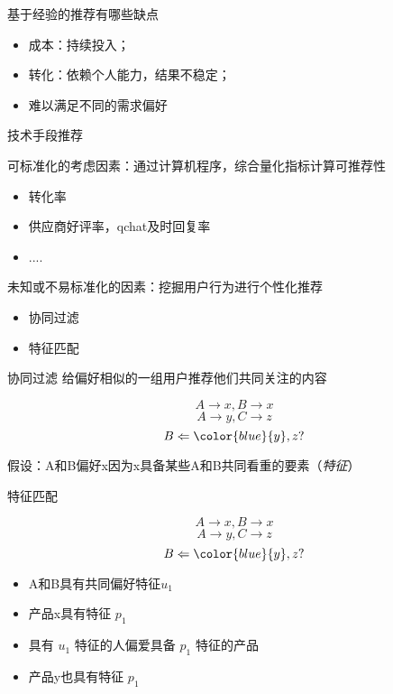\documentclass{beamer}
\begin{document}
\begin{CJK}{UTF8}{gbsn}
\begin{frame}{基于经验的推荐有哪些缺点}
  \begin{itemize}
    \item {成本：持续投入；}
    \item {转化：依赖个人能力，结果不稳定；}
    \item {难以满足不同的需求偏好}
  \end{itemize}
\end{frame}


\begin{frame}{技术手段推荐}
  \begin{block}{可标准化的考虑因素：通过计算机程序，综合量化指标计算可推荐性}
    \begin{itemize}
    \item {转化率}
    \item {供应商好评率，qchat及时回复率}
    \item {....}
    \end{itemize}
  \end{block}
  \begin{block}{未知或不易标准化的因素：挖掘用户行为进行个性化推荐}
    \begin{itemize}
      \item {协同过滤}
      \item {特征匹配}
    \end{itemize}
  \end{block}
\end{frame}

\begin{frame}{协同过滤}
  给偏好相似的一组用户推荐他们共同关注的内容

  $$ A \rightarrow x, B \rightarrow x $$
  $$ A \rightarrow y, C \rightarrow z $$
  $$ B \Leftarrow {\color{blue}{y}},z ?$$

  假设：A和B偏好x因为x具备某些A和B共同看重的要素（\emph{特征}）
  
\end{frame}

\begin{frame}{特征匹配}

  $$ A \rightarrow x, B \rightarrow x $$
  $$ A \rightarrow y, C \rightarrow z $$
  $$ B \Leftarrow {\color{blue}{y}},z ?$$

  \begin{itemize}
  \item { A和B具有共同偏好特征$ u_1 $ }
  \item { 产品x具有特征 $ p_1 $ }
  \item { 具有 $ u_1 $ 特征的人偏爱具备 $ p_1 $ 特征的产品 }
  \item { 产品y也具有特征 $ p_1 $ }
  \end{itemize}


\end{frame}
\end{CJK}
\end{document}
